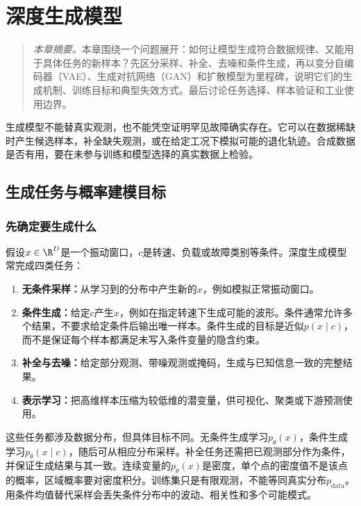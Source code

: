 \chapter{深度生成模型}
\begin{quote}\small
\textit{本章摘要。}本章围绕一个问题展开：如何让模型生成符合数据规律、又能用于具体任务的新样本？先区分采样、补全、去噪和条件生成，再以变分自编码器（VAE）、生成对抗网络（GAN）和扩散模型为里程碑，说明它们的生成机制、训练目标和典型失效方式。最后讨论任务选择、样本验证和工业使用边界。
\end{quote}

生成模型不能替真实观测，也不能凭空证明罕见故障确实存在。它可以在数据稀缺时产生候选样本，补全缺失观测，或在给定工况下模拟可能的退化轨迹。合成数据是否有用，要在未参与训练和模型选择的真实数据上检验。

\section{生成任务与概率建模目标}

\subsection{先确定要生成什么}

假设$x\in\R^D$是一个振动窗口，$c$是转速、负载或故障类别等条件。深度生成模型常完成四类任务：
\begin{enumerate}
  \item \textbf{无条件采样：}从学习到的分布中产生新的$x$，例如模拟正常振动窗口。
  \item \textbf{条件生成：}给定$c$产生$x$，例如在指定转速下生成可能的波形。条件通常允许多个结果，不要求给定条件后输出唯一样本。条件生成的目标是近似$p(x\mid c)$，而不是保证每个样本都满足未写入条件变量的隐含约束。
  \item \textbf{补全与去噪：}给定部分观测、带噪观测或掩码，生成与已知信息一致的完整结果。
  \item \textbf{表示学习：}把高维样本压缩为较低维的潜变量，供可视化、聚类或下游预测使用。
\end{enumerate}

这些任务都涉及数据分布，但具体目标不同。无条件生成学习$p_{\theta}(x)$，条件生成学习$p_{\theta}(x\mid c)$，随后可从相应分布采样。补全任务还需把已观测部分作为条件，并保证生成结果与其一致。连续变量的$p_{\theta}(x)$是密度，单个点的密度值不是该点的概率，区域概率要对密度积分。训练集只是有限观测，不能等同真实分布$p_{\mathrm{data}}$。用条件均值替代采样会丢失条件分布中的波动、相关性和多个可能模式。

